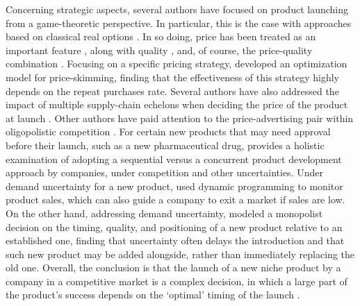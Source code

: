 \documentclass[a4paper,fleqn, 11pt]{cas-sc}
\begin{document}
Concerning strategic aspects, several authors have focused on product launching from a game-theoretic perspective.   In particular, this is the case with approaches based  on classical real options  \citep{dixit1994investment,trigeorgis1996real}.
In so doing, price has been treated as an important feature \citep{LI2019287, LIN20201026, 2023LiHao}, along with quality \citep{JAFARZADEHGHAZI2023486}, and, of course, the price-quality combination \citep{pammer2000forecasting,wang2022product}. 
Focusing on a specific pricing strategy, \cite{lotfi2024skim} developed an optimization model for price-skimming, %
  finding that the effectiveness of this strategy highly depends on the  repeat purchases rate.
Several authors have also addressed the impact of multiple supply-chain echelons when deciding the price of the product at launch \citep{Wei2013, Wang2017, SaneZerang2018,   Taleizadeh2019}.  Other authors have paid attention to the price-advertising pair within oligopolistic competition %
 \citep{golan2000estimating}. For certain new products that may need approval before their launch,  such as a new pharmaceutical drug, \cite{limon2023sequential} provides a holistic examination of adopting a sequential versus a concurrent product development approach by companies, under competition and other uncertainties. Under demand uncertainty for a new product, \cite{ hitsch2006empirical} used dynamic programming to monitor product sales, which can also guide a company to exit a market if sales are low. 
 On the other hand, addressing demand uncertainty, \cite{balter2025innovation} modeled a monopolist decision on the timing, quality, and positioning of a new product relative to an established one, finding that uncertainty often delays the introduction and that such new product may be added alongside, rather than immediately replacing the old one. 
Overall, the conclusion is that the launch of a new niche product by a company in a competitive market is a complex decision, in which a large part of the product's success depends on the `optimal' timing of the launch \citep{hultink1997industrial, savin2005optimal, calantone2007clustering}.
 

  
\end{document}
